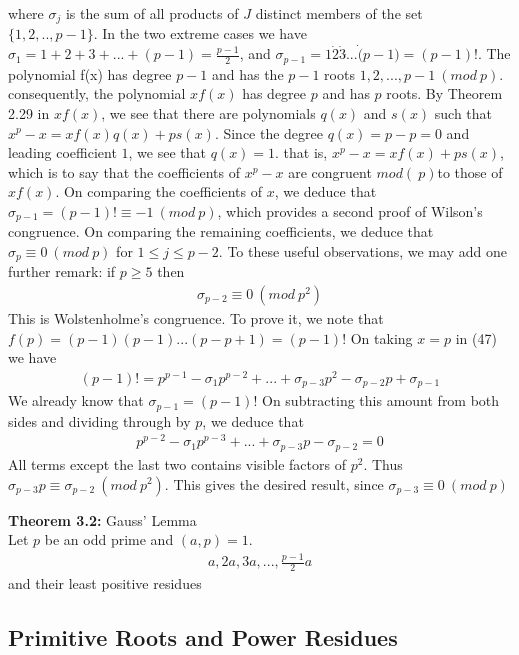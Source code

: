 \documentclass[a4paper]{article}
\begin{document}
where $\sigma_j$ is the sum of all products of $J$ distinct members of the set $\{1,2,..,p-1\}$. In the two extreme cases we have $\sigma_1=1+2+3+...+(p-1)=\frac{p-1}{2}$, and $\sigma_{p-1}=1\dot2\dot3\dot...\dot(p-1)=(p-1)!$. The polynomial f(x) has degree $p-1$ and has the $p-1$ roots $1,2,...,p-1\ (mod\ p)$. consequently, the polynomial $xf(x)$ has degree $p$ and has $p$ roots. By Theorem 2.29 in $xf(x)$, we see that there are polynomials $q(x)$ and $s(x)$ such that $x^p-x=xf(x)q(x)+ps(x)$. Since the degree $q(x)=p-p=0$ and leading coefficient $1$, we see that $q(x)=1$. that is, $x^p-x=xf(x)+ps(x)$, which is to say that the coefficients of $x^p-x$ are congruent $mod(\ p)$to those of $xf(x)$. On comparing the coefficients of $x$, we deduce that $\sigma_{p-1}=(p-1)!\equiv -1\ (mod\ p)$, which provides a second proof of Wilson's congruence. On comparing the remaining coefficients, we deduce that $\sigma_{p}\equiv 0\ (mod\ p)$ for $1\leq j\leq p-2$. To these useful observations, we may add one further remark: if $p\geq 5$ then
\begin{align*}
    \sigma_{p-2}\equiv 0\ (mod\ p^2)
\end{align*}
This is Wolstenholme's congruence. To prove it, we note that $f(p)=(p-1)(p-1)...(p-p+1)=(p-1)!$ On taking $x=p$ in (47) we have
\begin{align*}
    (p-1)! = p^{p-1}-\sigma_1p^{p-2}+...+\sigma_{p-3}p^2-\sigma_{p-2}p+\sigma_{p-1}
\end{align*}
We already know that $\sigma_{p-1}=(p-1)!$ On subtracting this amount from both sides and dividing through by $p$, we deduce that
\begin{align*}
    p^{p-2}-\sigma_{1}p^{p-3}+...+\sigma_{p-3}p-\sigma_{p-2}=0
\end{align*}
All terms except the last two contains visible factors of $p^2$. Thus $\sigma_{p-3}p\equiv \sigma_{p-2}\ (mod\ p^2)$. This gives the desired result, since $\sigma_{p-3}\equiv 0\ (mod\ p)$

\textbf{Theorem 3.2:} Gauss' Lemma\\
Let $p$ be an odd prime and $(a,p)=1$.
\begin{align}
    a,2a,3a,...,\frac{p-1}{2}a
\end{align}
and their least positive residues


\subsection{Primitive Roots and Power Residues}
\end{document}
